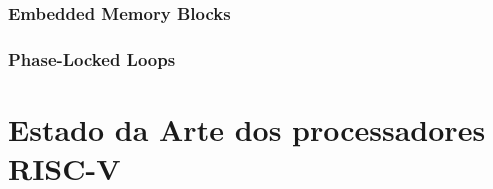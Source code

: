         \subsubsection{Embedded Memory Blocks}
        {}

        \subsubsection{Phase-Locked Loops}
        {}


\section{Estado da Arte dos processadores RISC-V}

